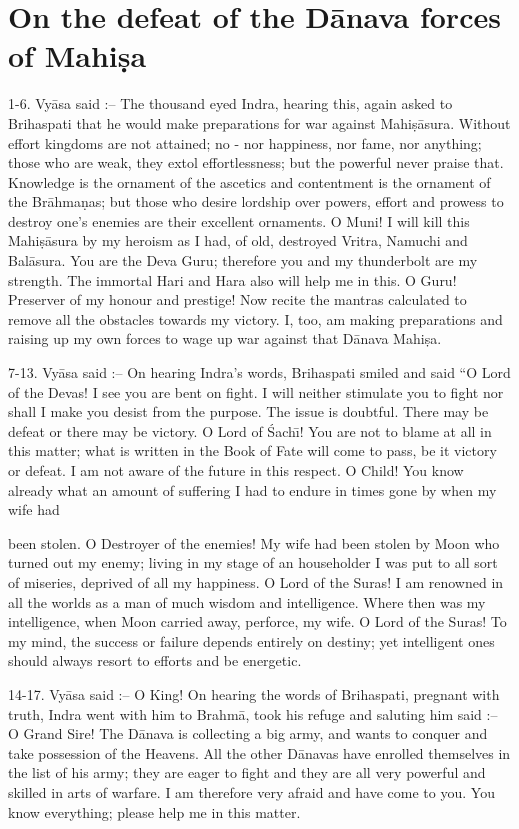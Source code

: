 \chapter{On the defeat of the D\=anava forces of Mahi\d{s}a}

1-6. Vy\=asa said :-- The thousand eyed Indra, hearing this, again asked to Brihaspati that he would make preparations for war against Mahi\d{s}\=asura. Without effort kingdoms are not attained; no - nor happiness, nor fame, nor anything; those who are weak, they extol effortlessness; but the powerful never praise that. Knowledge is the ornament of the ascetics and contentment is the ornament of the Br\=ahma\d{n}as; but those who desire lordship over powers, effort and prowess to destroy one's enemies are their excellent ornaments. O Muni! I will kill this Mahi\d{s}\=asura by my heroism as I had, of old, destroyed Vritra, Namuchi and Bal\=asura. You are the Deva Guru; therefore you and my thunderbolt are my strength. The immortal Hari and Hara also will help me in this. O Guru! Preserver of my honour and prestige! Now recite the mantras calculated to remove all the obstacles towards my victory. I, too, am making preparations and raising up my own forces to wage up war against that D\=anava Mahi\d{s}a.

7-13. Vy\=asa said :-- On hearing Indra's words, Brihaspati smiled and said ``O Lord of the Devas! I see you are bent on fight. I will neither stimulate you to fight nor shall I make you desist from the purpose. The issue is doubtful. There may be defeat or there may be victory. O Lord of \'Sach\={\i}! You are not to blame at all in this matter; what is written in the Book of Fate will come to pass, be it victory or defeat. I am not aware of the future in this respect. O Child! You know already what an amount of suffering I had to endure in times gone by when my wife had

been stolen. O Destroyer of the enemies! My wife had been stolen by Moon who turned out my enemy; living in my stage of an householder I was put to all sort of miseries, deprived of all my happiness. O Lord of the Suras! I am renowned in all the worlds as a man of much wisdom and intelligence. Where then was my intelligence, when Moon carried away, perforce, my wife. O Lord of the Suras! To my mind, the success or failure depends entirely on destiny; yet intelligent ones should always resort to efforts and be energetic.

14-17. Vy\=asa said :-- O King! On hearing the words of Brihaspati, pregnant with truth, Indra went with him to Brahm\=a, took his refuge and saluting him said :-- O Grand Sire! The D\=anava is collecting a big army, and wants to conquer and take possession of the Heavens. All the other D\=anavas have enrolled themselves in the list of his army; they are eager to fight and they are all very powerful and skilled in arts of warfare. I am therefore very afraid and have come to you. You know everything; please help me in this matter.

